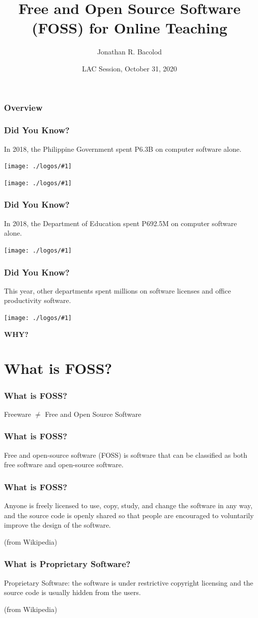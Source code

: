 \documentclass[17pt]{beamer}
\title[FOSS for Online Teaching] {Free and Open Source Software (FOSS) for Online Teaching}
\author{Jonathan R. Bacolod}
\institute[SHS]{Sauyo High School}
\date[LAC Session, Oct. 2020]{LAC Session, October 31, 2020}
\newcommand{\fullpic}[1]{\begin{frame}
\texttt{[image: ./logos/\#1]}
\end{frame}
}
\newcommand{\trivia}[1]{\begin{frame}
		\frametitle{Did You Know?}
		\begin{center}
			#1
		\end{center}
	\end{frame}
}
\begin{document}
	\frame{\titlepage}

	\begin{frame}
		\frametitle{Overview}
		\tableofcontents 
	\end{frame}
	
	\trivia{In 2018, the Philippine Government spent P6.3B on computer software alone.}
	
	\fullpic{software-budget.png}
	
	\fullpic{coa.png}
	
	\trivia{In 2018, the Department of Education spent P692.5M on computer software alone.}
	
	\fullpic{deped-software-budget.png}
	
	\trivia{This year, other departments spent millions on software licenses and office productivity software.}
	
	\fullpic{philhealth-proposed-budget.png}
	
	\begin{frame}
		\begin{center}
				\textbf{ \LARGE WHY?}
		\end{center} 
	\end{frame}
	
	\section{What is FOSS?}
	\begin{frame}
		\frametitle{What is FOSS?}
		\begin{center}
			Freeware $ \neq $ Free and Open Source Software
		\end{center}
	\end{frame}

    \begin{frame}
    	\frametitle{What is FOSS?}
    	Free and open-source software (FOSS) is software that can be classified as both free software and open-source software. 
    \end{frame}

	\begin{frame}
		\frametitle{What is FOSS?}
		Anyone is freely licensed to use, copy, study, and change the software in any way, and the source code is openly shared so that people are encouraged to voluntarily improve the design of the software.
		
		(from Wikipedia)
	\end{frame}

	\begin{frame}
		\frametitle{What is Proprietary Software?}
	Proprietary Software: the software is under restrictive copyright licensing and the source code is usually hidden from the users. 
	
	(from Wikipedia)
	\end{frame}
\end{document}

